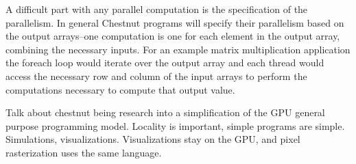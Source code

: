 A difficult part with any parallel computation is the specification of the parallelism. In general Chestnut programs will specify their parallelism based on the output arrays--one computation is one for each element in the output array, combining the necessary inputs. For an example matrix multiplication application the foreach loop would iterate over the output array and each thread would access the necessary row and column of the input arrays to perform the computations necessary to compute that output value. 

Talk about chestnut being research into a simplification of the GPU general purpose programming model. Locality is important, simple programs are simple. Simulations, visualizations. Visualizations stay on the GPU, and pixel rasterization uses the same language.
